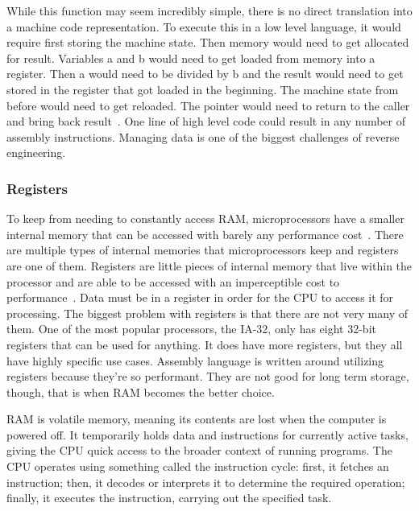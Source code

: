 While this function may seem incredibly simple, there is no direct translation into a machine code representation. 
To execute this in a low level language, it would require first storing the machine state. 
Then memory would need to get allocated for result. Variables a and b would need to get loaded from memory into a register. 
Then a would need to be divided by b and the result would need to get stored in the register that got loaded in the beginning. 
The machine state from before would need to get reloaded. The pointer would need to return to the caller and bring back result~\cite{Reversing}.
One line of high level code could result in any number of assembly instructions.
Managing data is one of the biggest challenges of reverse engineering.


\subsubsection{Registers}
To keep from needing to constantly access RAM, microprocessors have a smaller internal memory that can be accessed with barely any performance cost~\cite{Reversing}. 
There are multiple types of internal memories that microprocessors keep and registers are one of them.
Registers are little pieces of internal memory that live within the processor and are able to be accessed with an imperceptible cost to performance~\cite{PracticalRE}. Data must be in a register in order for the CPU to access it for processing. 
The biggest problem with registers is that there are not very many of them. 
One of the most popular processors, the IA-32, only has eight 32-bit registers that can be used for anything. 
It does have more registers, but they all have highly specific use cases. 
Assembly language is written around utilizing registers because they’re so performant. 
They are not good for long term storage, though, that is when RAM becomes the better choice.

RAM is volatile memory, meaning its contents are lost when the computer is powered off. It temporarily holds data and instructions for currently active tasks, giving the CPU quick access to the broader context of running programs. The CPU operates using something called the instruction cycle: first, it fetches an instruction; then, it decodes or interprets it to determine the required operation; finally, it executes the instruction, carrying out the specified task.

